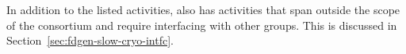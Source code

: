 In addition to the listed activities,  also has activities that span
outside the scope of the consortium and require interfacing with other
groups. This is discussed in Section~\ref{sec:fdgen-slow-cryo-intfc}.

